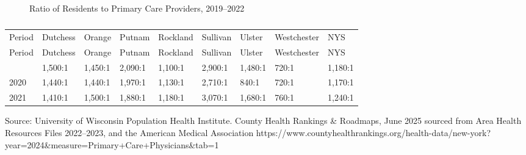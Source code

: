 \documentclass[
  english,
  letterpaper,
]{report}
\begin{document}
\begin{figure}


\caption{\label{fig-primary-care-providers}Ratio of Residents to Primary
Care Providers, 2019--2022}

\end{figure}%

\begin{longtable}[]{@{}lllllllll@{}}

\caption{\label{tbl-primary-care-providers}Ratio of Residents to Primary
Care Providers, 2019--2022}

\tabularnewline

\caption{}\label{T_b0b99}\tabularnewline
\toprule\noalign{}
Period & Dutchess & Orange & Putnam & Rockland & Sullivan & Ulster &
Westchester & NYS \\
\midrule\noalign{}
\endfirsthead
\toprule\noalign{}
Period & Dutchess & Orange & Putnam & Rockland & Sullivan & Ulster &
Westchester & NYS \\
\midrule\noalign{}
\endhead
\bottomrule\noalign{}
\endlastfoot
2019 & 1,500:1 & 1,450:1 & 2,090:1 & 1,100:1 & 2,900:1 & 1,480:1 & 720:1
& 1,180:1 \\
2020 & 1,440:1 & 1,440:1 & 1,970:1 & 1,130:1 & 2,710:1 & 840:1 & 720:1 &
1,170:1 \\
2021 & 1,410:1 & 1,500:1 & 1,880:1 & 1,180:1 & 3,070:1 & 1,680:1 & 760:1
& 1,240:1 \\

\end{longtable}

\begin{tcolorbox}[enhanced jigsaw, breakable, leftrule=.75mm, title=\textcolor{quarto-callout-note-color}{\faInfo}\hspace{0.5em}{Source}, bottomrule=.15mm, opacityback=0, left=2mm, colback=white, bottomtitle=1mm, coltitle=black, colbacktitle=quarto-callout-note-color!10!white, colframe=quarto-callout-note-color-frame, opacitybacktitle=0.6, toptitle=1mm, titlerule=0mm, arc=.35mm, rightrule=.15mm, toprule=.15mm]

Source: University of Wisconsin Population Health Institute. County
Health Rankings \& Roadmaps, June 2025 sourced from Area Health
Resources Files 2022--2023, and the American Medical Association
https://www.countyhealthrankings.org/health-data/new-york?year=2024\&measure=Primary+Care+Physicians\&tab=1

\end{tcolorbox}
\end{document}
